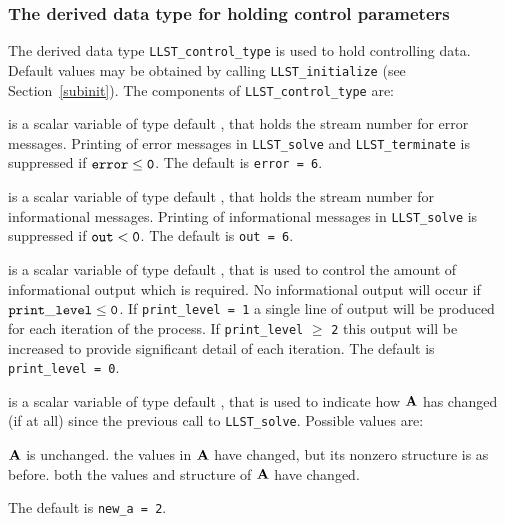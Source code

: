 \documentclass{galahad}
\newcommand{\packagename}{LLST}
\begin{document}

\subsubsection{The derived data type for holding control 
 parameters}\label{typecontrol}
The derived data type 
{\tt \packagename\_control\_type} 
is used to hold controlling data. Default values may be obtained by calling 
{\tt \packagename\_initialize}
(see Section~\ref{subinit}). The components of 
{\tt \packagename\_control\_type} 
are:

\begin{description}
 is a scalar variable of type default \integer, that holds the 
stream number for error messages. 
Printing of error messages in  
{\tt \packagename\_solve} and {\tt \packagename\_terminate} 
is suppressed if ${\tt error} \leq {\tt 0}$. 
The default is {\tt error = 6}.
 
 is a scalar variable of type default \integer, that holds the 
stream number for informational messages. 
Printing of informational messages in  
{\tt \packagename\_solve} is suppressed if ${\tt out} < {\tt 0}$. 
The default is {\tt out = 6}.
 
 is a scalar variable of type default \integer, 
that is used 
to control the amount of informational output which is required. No  
informational output will occur if ${\tt print\_level} \leq {\tt 0}$. If  
{\tt print\_level = 1} a single line of output will be produced for each 
iteration of the process. If {\tt print\_level} $\geq$ {\tt 2} this output 
will be increased to provide significant detail of each iteration. 
The default is {\tt print\_level = 0}.
 

 is a scalar variable of type default \integer, that is used
to indicate how ${\mathbf{A}}$ has changed (if at all) since the previous 
call to {\tt \packagename\_solve}. Possible values are:
\begin{description}
 ${\mathbf{A}}$ is unchanged.
 the values in ${\mathbf{A}}$ have changed, but its nonzero structure 
is as before.
 both the values and structure of ${\mathbf{A}}$ have changed.
\end{description}
The default is {\tt new\_a = 2}.


\end{description}
\end{document}
